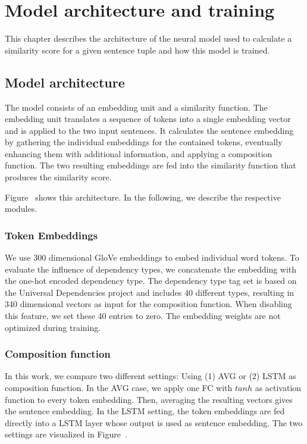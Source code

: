\section{Model architecture and training}
This chapter describes the architecture of the neural model used to calculate a similarity score for a given sentence tuple and how this model is trained.

\subsection{Model architecture}
The model consists of an embedding unit and a similarity function. The embedding unit translates a sequence of tokens into a single embedding vector and is applied to the two input sentences. It calculates the sentence embedding by gathering the individual embeddings for the contained tokens, eventually enhancing them with additional information, and applying a composition function. The two resulting embeddings are fed into the similarity function that produces the similarity score. 

Figure~ shows this architecture. In the following, we describe the respective modules. 

\subsubsection{Token Embeddings}
We use 300 dimensional GloVe embeddings  \autocite{pennington_glove_2014} to embed individual word tokens. To evaluate the influence of dependency types, we concatenate the embedding with the one-hot encoded dependency type. The dependency type tag set is based on the Universal Dependencies project \autocite{nivre_universal_2016} and includes 40 different types, resulting in 340 dimensional vectors as input for the composition function. When disabling this feature, we set these 40 entries to zero. The embedding weights are not optimized during training.   

\subsubsection{Composition function}
In this work, we compare two different settings: Using (1) \acf{AVG} or (2) \acf{LSTM} as composition function. 
In the \ac{AVG} case, we apply one \acf{FC} with $tanh$ as activation function to every token embedding. Then, averaging the resulting vectors gives the sentence embedding.
In the \ac{LSTM} setting, the token embeddings are fed directly into a LSTM layer whose output is used as sentence embedding. The two settings are visualized in Figure~.

